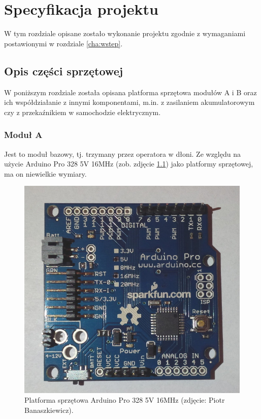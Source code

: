 \chapter{Specyfikacja projektu}
\label{cha:specyfikacja_projektu}

W tym rozdziale opisane zostało wykonanie projektu zgodnie z wymaganiami postawionymi w rozdziale \ref{cha:wstep}.


\section{Opis części sprzętowej}
\label{sec:opis_cz_sprzetowej}

W poniższym rozdziale została opisana platforma sprzętowa modułów A i B oraz ich współdziałanie z innymi komponentami, m.in. z zasilaniem akumulatorowym czy z przekaźnikiem w samochodzie elektrycznym.

\subsection{Moduł A}
\label{subsec:modul_a}

Jest to moduł bazowy, tj. trzymany przez operatora w dłoni. Ze względu na użycie Arduino Pro 328 5V 16MHz \cite{Ard00} (zob. zdjęcie \ref{fig:arduino_pro}) jako platformy sprzętowej, ma on niewielkie wymiary.

\begin{figure}[h]
	\centering
	\includegraphics[scale=0.3]{pics/arduino_pro_scaled.jpg}
	\caption{\label{fig:arduino_pro}Platforma sprzętowa Arduino Pro 328 5V 16MHz (zdjęcie: Piotr Banaszkiewicz).}
\end{figure}

